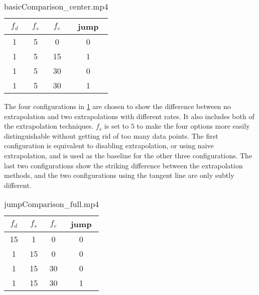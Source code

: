 \begin{table}[H]
    \begin{center}
    \caption{basicComparison\_center.mp4}%
    \label{tab:exampleOne}
    \begin{tabular}{c|c|c|c}
        \toprule
        $f_d$ & $f_s$ & $f_e$ & jump \\
        \midrule
        1 & 5 & 0 & 0 \\
        1 & 5 & 15 & 1 \\
        1 & 5 & 30 & 0 \\
        1 & 5 & 30 & 1 \\
        \bottomrule
    \end{tabular}
    \end{center}

\end{table}

The four configurations in \cref{tab:exampleOne} are chosen to show the difference between no extrapolation and two extrapolations with different rates.
It also includes both of the extrapolation techniques.
$f_s$ is set to $5$ to make the four options more easily distinguishable without getting rid of too many data points.
The first configuration is equivalent to disabling extrapolation, or using naive extrapolation, and is used as the baseline for the other three configurations.
The last two configurations show the striking difference between the extrapolation methods, and the two configurations using the tangent line are only subtly  different.

\begin{table}[H]
    \begin{center}
    \caption{jumpComparison\_full.mp4}%
    \label{tab:exampleTwo}
    \begin{tabular}{c|c|c|c}
        \toprule
        $f_d$ & $f_s$ & $f_e$ & jump \\
        \midrule
        15 & 1 & 0 & 0 \\
        1 & 15 & 0 & 0 \\
        1 & 15 & 30 & 0 \\
        1 & 15 & 30 & 1 \\
        \bottomrule
    \end{tabular}
    \end{center}

\end{table}

